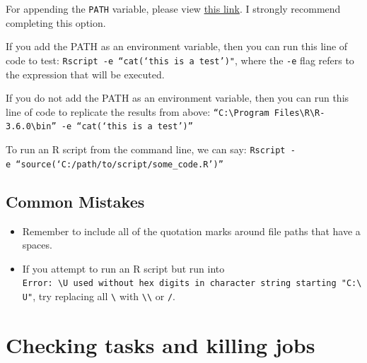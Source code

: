 \documentclass[
]{book}
\providecommand{\tightlist}{%
  \setlength{\itemsep}{0pt}\setlength{\parskip}{0pt}}
\begin{document}
For appending the \texttt{PATH} variable, please view \href{https://www.howtogeek.com/118594/how-to-edit-your-system-path-for-easy-command-line-access/}{this link}. I strongly recommend completing this option.

If you add the PATH as an environment variable, then you can run this line of code to test:
\texttt{Rscript\ -e\ “cat(‘this\ is\ a\ test’)"}, where the \texttt{-e} flag refers to the expression that will be executed.

If you do not add the PATH as an environment variable, then you can run this line of code to replicate the results from above:
\texttt{“C:\textbackslash{}Program\ Files\textbackslash{}R\textbackslash{}R-3.6.0\textbackslash{}bin”\ -e\ “cat(‘this\ is\ a\ test’)”}

To run an R script from the command line, we can say:
\texttt{Rscript\ -e\ “source(‘C:/path/to/script/some\_code.R’)”}

\hypertarget{common-mistakes}{%
\subsection{Common Mistakes}\label{common-mistakes}}

\begin{itemize}
\tightlist
\item
  Remember to include all of the quotation marks around file paths that have a spaces.
\item
  If you attempt to run an R script but run into \texttt{Error:\ \textquotesingle{}\textbackslash{}U\textquotesingle{}\ used\ without\ hex\ digits\ in\ character\ string\ starting\ "\textquotesingle{}C:\textbackslash{}U"}, try replacing all \texttt{\textbackslash{}} with \texttt{\textbackslash{}\textbackslash{}} or \texttt{/}.
\end{itemize}

\hypertarget{checking-tasks-and-killing-jobs}{%
\section{Checking tasks and killing jobs}\label{checking-tasks-and-killing-jobs}}
\end{document}

